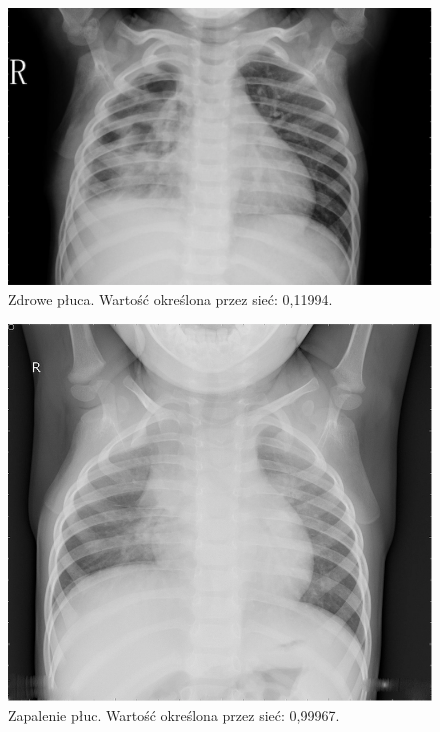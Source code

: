 \documentclass[12pt,a4paper,twoside,titlepage,openright]{book}
\begin{document}
\begin{figure}[ht]
	\centering
			\includegraphics[resolution=100, scale=0.3]{randomCorrect1.png}
		\caption{Zdrowe płuca. Wartość określona przez sieć: 0,11994.}
				\label{fig:randomCorrect1}
\end{figure}

\begin{figure}[ht]
	\centering
			\includegraphics[resolution=100, scale=0.3]{randomCorrect2.png}
		\caption{Zapalenie płuc. Wartość określona przez sieć: 0,99967.}
				\label{fig:randomCorrect2}
\end{figure}
\end{document}
